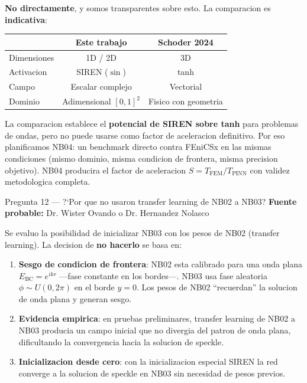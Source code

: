 \begin{answerbox}
\textbf{No directamente}, y somos transparentes sobre esto. La comparacion es
\textbf{indicativa}:

\begin{tabular}{@{}lcc@{}}
\toprule
 & \textbf{Este trabajo} & \textbf{Schoder 2024} \\
\midrule
Dimensiones & 1D / 2D & 3D \\
Activacion & SIREN ($\sin$) & tanh \\
Campo & Escalar complejo & Vectorial \\
Dominio & Adimensional $[0,1]^2$ & Fisico con geometria \\
\bottomrule
\end{tabular}

\vspace{6pt}
La comparacion establece el \textbf{potencial de SIREN sobre tanh} para problemas
de ondas, pero no puede usarse como factor de aceleracion definitivo. Por eso
planificamos NB04: un benchmark directo contra FEniCSx en las mismas condiciones
(mismo dominio, misma condicion de frontera, misma precision objetivo). NB04
producira el factor de aceleracion $S = T_\text{FEM}/T_\text{PINN}$ con
validez metodologica completa.
\end{answerbox}

\vspace{8pt}

\begin{qabox}{Pregunta 12 --- ?`Por que no usaron transfer learning de NB02 a NB03?}
\textbf{Fuente probable:} Dr. Wister Ovando o Dr. Hernandez Nolasco
\end{qabox}

\begin{answerbox}
Se evaluo la posibilidad de inicializar NB03 con los pesos de NB02 (transfer
learning). La decision de \textbf{no hacerlo} se basa en:

\begin{enumerate}
  \item \textbf{Sesgo de condicion de frontera}: NB02 esta calibrado para una onda
        plana $E_\text{BC} = e^{ikr}$ ---fase constante en los bordes---. NB03 usa
        fase aleatoria $\phi \sim U(0, 2\pi)$ en el borde $y=0$. Los pesos de NB02
        ``recuerdan'' la solucion de onda plana y generan sesgo.

  \item \textbf{Evidencia empirica}: en pruebas preliminares, transfer learning de
        NB02 a NB03 producia un campo inicial que no divergia del patron de onda
        plana, dificultando la convergencia hacia la solucion de speckle.

  \item \textbf{Inicializacion desde cero}: con la inicializacion especial SIREN
        la red converge a la solucion de speckle en NB03 sin necesidad de pesos previos.
\end{enumerate}
\end{answerbox}

